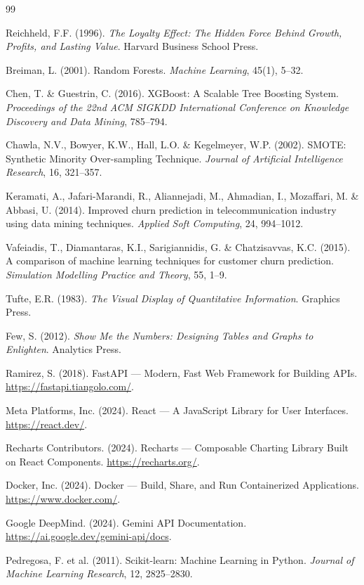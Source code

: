 \documentclass[12pt, a4paper]{report}
\begin{document}
\begin{thebibliography}{99}

Reichheld, F.F. (1996). \textit{The Loyalty Effect: The Hidden Force Behind Growth, Profits, and Lasting Value}. Harvard Business School Press.

Breiman, L. (2001). Random Forests. \textit{Machine Learning}, 45(1), 5--32.

Chen, T. \& Guestrin, C. (2016). XGBoost: A Scalable Tree Boosting System. \textit{Proceedings of the 22nd ACM SIGKDD International Conference on Knowledge Discovery and Data Mining}, 785--794.

Chawla, N.V., Bowyer, K.W., Hall, L.O. \& Kegelmeyer, W.P. (2002). SMOTE: Synthetic Minority Over-sampling Technique. \textit{Journal of Artificial Intelligence Research}, 16, 321--357.

Keramati, A., Jafari-Marandi, R., Aliannejadi, M., Ahmadian, I., Mozaffari, M. \& Abbasi, U. (2014). Improved churn prediction in telecommunication industry using data mining techniques. \textit{Applied Soft Computing}, 24, 994--1012.

Vafeiadis, T., Diamantaras, K.I., Sarigiannidis, G. \& Chatzisavvas, K.C. (2015). A comparison of machine learning techniques for customer churn prediction. \textit{Simulation Modelling Practice and Theory}, 55, 1--9.

Tufte, E.R. (1983). \textit{The Visual Display of Quantitative Information}. Graphics Press.

Few, S. (2012). \textit{Show Me the Numbers: Designing Tables and Graphs to Enlighten}. Analytics Press.

Ramirez, S. (2018). FastAPI --- Modern, Fast Web Framework for Building APIs. \url{https://fastapi.tiangolo.com/}.

Meta Platforms, Inc. (2024). React --- A JavaScript Library for User Interfaces. \url{https://react.dev/}.

Recharts Contributors. (2024). Recharts --- Composable Charting Library Built on React Components. \url{https://recharts.org/}.

Docker, Inc. (2024). Docker --- Build, Share, and Run Containerized Applications. \url{https://www.docker.com/}.

Google DeepMind. (2024). Gemini API Documentation. \url{https://ai.google.dev/gemini-api/docs}.

Pedregosa, F. et al. (2011). Scikit-learn: Machine Learning in Python. \textit{Journal of Machine Learning Research}, 12, 2825--2830.

\end{thebibliography}
\end{document}
